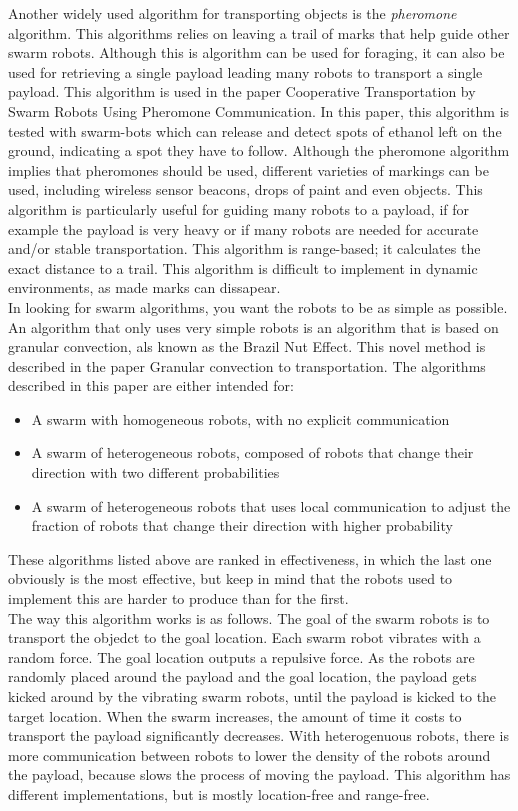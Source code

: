 Another widely used algorithm for transporting objects is the \emph{pheromone} algorithm. 
This algorithms relies on leaving a trail of marks that help guide other swarm robots. 
Although this is algorithm can be used for foraging, it can also be used for retrieving a single payload leading many robots to transport a single payload.
This algorithm is used in the paper Cooperative Transportation by Swarm Robots Using Pheromone Communication. \cite{Fujisawa2013}
 In this paper, this algorithm is tested with swarm-bots which can release and detect spots of ethanol left on the ground, indicating a spot they have to follow. Although the pheromone algorithm implies that pheromones should be used, different varieties of markings can be used, including wireless sensor beacons, drops of paint and even objects. This algorithm is particularly useful for guiding many robots to a payload, if for example the payload is very heavy or if many robots are needed for accurate and/or stable transportation. This algorithm is range-based; it calculates the exact distance to a trail. This algorithm is difficult to implement in dynamic environments, as made marks can dissapear. \\

In looking for swarm algorithms, you want the robots to be as simple as possible. An algorithm that only uses very simple robots is an algorithm that is based on granular convection, als known as the Brazil Nut Effect. This novel method is described in the paper Granular convection to transportation.\cite{Sugawara2012} The algorithms described in this paper are either intended for:

\begin{itemize}
  \item A swarm with homogeneous robots, with no explicit communication
  \item A swarm of heterogeneous robots, composed of robots that change their direction with two different probabilities
  \item A swarm of heterogeneous robots that uses local communication to adjust the fraction of robots that change their direction with higher probability
\end{itemize}

These algorithms listed above are ranked in effectiveness, in which the last one obviously is the most effective, but keep in mind that the robots used to implement this are harder to produce than for the first. \\ The way this algorithm works is as follows. The goal of the swarm robots is to transport the objedct to the goal location. Each swarm robot vibrates with a random force. The goal location outputs a repulsive force. As the robots are randomly placed around the payload and the goal location, the payload gets kicked around by the vibrating swarm robots, until the payload is kicked to the target location. When the swarm increases, the amount of time it costs to transport the payload significantly decreases. With heterogenuous robots, there is more communication between robots to lower the density of the robots around the payload, because slows the process of moving the payload.  This algorithm has different implementations, but is mostly location-free and  range-free. 


